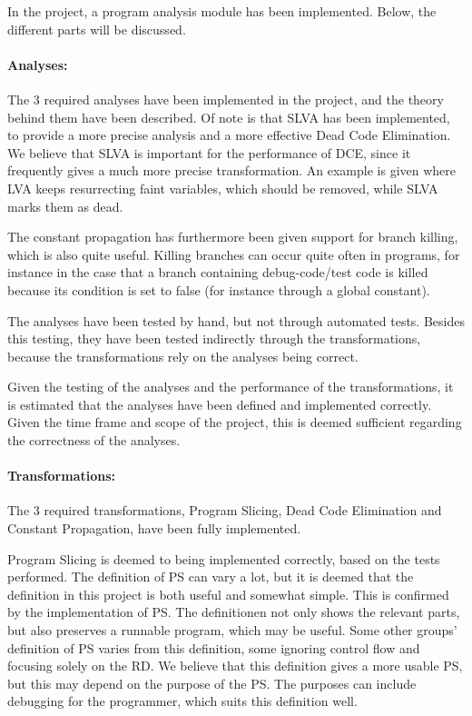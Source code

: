 
In the project, a program analysis module has been implemented.
Below, the different parts will be discussed.

\paragraph{Analyses:}
The 3 required analyses have been implemented in the project,
and the theory behind them have been described. Of note is that
SLVA has been implemented, to provide a more precise analysis
and a more effective Dead Code Elimination. We believe that SLVA
is important for the performance of DCE, since it frequently gives
a much more precise transformation. An example is given where LVA
keeps resurrecting faint variables, which should be removed, while
SLVA marks them as dead.

The constant propagation
has furthermore been given support for branch killing, which is also
quite useful. Killing branches can occur quite often in programs, for
instance in the case that a branch containing debug-code/test code
is killed because its condition is set to false (for instance through
a global constant).

The analyses have been tested by hand, but not through automated tests.
Besides this testing, they have been tested indirectly through the
transformations, because the transformations rely on the analyses being
correct.

Given the testing of the analyses and the performance of the transformations,
it is estimated that the analyses have been defined and implemented correctly.
Given the time frame and scope of the project, this is deemed sufficient
regarding the correctness of the analyses.

\paragraph{Transformations:}
The 3 required transformations, Program Slicing, Dead Code Elimination
and Constant Propagation, have been fully implemented.

Program Slicing is deemed to being implemented correctly, based on the
tests performed. The definition of PS can vary a lot, but it is deemed
that the definition in this project is both useful and somewhat simple.
This is confirmed by the implementation of PS. The definitionen not only
shows the relevant parts, but also preserves a runnable program, which
may be useful. Some other groups' definition of PS varies from this definition,
some ignoring control flow and focusing solely on the RD.
We believe that this definition gives a more usable PS, but this may depend
on the purpose of the PS. The purposes can include debugging for the
programmer, which suits this definition well.

